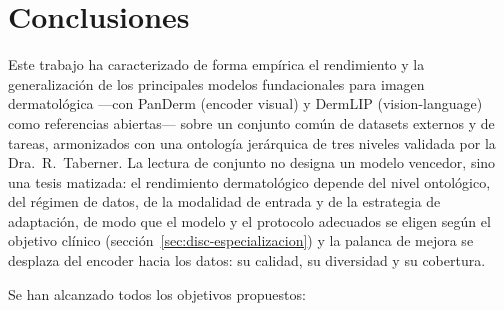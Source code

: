 
\chapter{Conclusiones}
\label{cap:conclusiones}

Este trabajo ha caracterizado de forma empírica el rendimiento y la
generalización de los principales modelos fundacionales para imagen
dermatológica ---con PanDerm (encoder visual) y DermLIP
(vision-language) como referencias abiertas--- sobre un conjunto común
de datasets externos y de tareas, armonizados con una ontología
jerárquica de tres niveles validada por la Dra.~R.~Taberner. La lectura
de conjunto no designa un modelo vencedor, sino una tesis matizada: el
rendimiento dermatológico depende del nivel ontológico, del régimen de
datos, de la modalidad de entrada y de la estrategia de adaptación, de
modo que el modelo y el protocolo adecuados se eligen según el objetivo
clínico (sección~\ref{sec:disc-especializacion}) y la palanca de mejora
se desplaza del encoder hacia los datos: su calidad, su diversidad y su
cobertura.

Se han alcanzado todos los objetivos propuestos:

